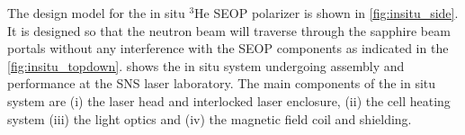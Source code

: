 The design model for the in situ $^3$He SEOP polarizer is shown in \cref{fig:insitu_side}. It is designed so that the neutron beam will traverse through the sapphire beam portals without any interference with the SEOP components as indicated in the \cref{fig:insitu_topdown}.  shows the in situ system undergoing assembly and performance at the SNS laser laboratory. The main components of the in situ system are (i) the laser head and interlocked laser enclosure, (ii) the cell heating system (iii) the light optics and (iv) the magnetic field coil and shielding.

